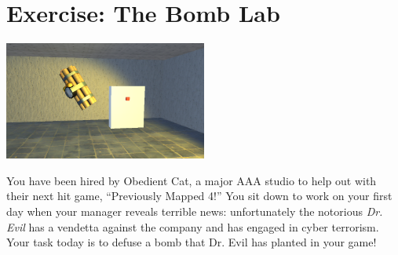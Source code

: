 \documentclass[11pt]{article}
\begin{document}
\section{Exercise: The Bomb Lab}
\begin{center}
\includegraphics[width=0.5\textwidth]{bomblab-1}
\end{center}
You have been hired by Obedient Cat, a major AAA studio to help out with their next hit game, 
``Previously Mapped 4!''  You sit down to work on your first day when your manager reveals terrible
news: unfortunately the notorious \textit{Dr. Evil} has a vendetta against the company and has 
engaged in cyber terrorism.  Your task today is to defuse a bomb that Dr. Evil has planted in your 
game!
\end{document}
